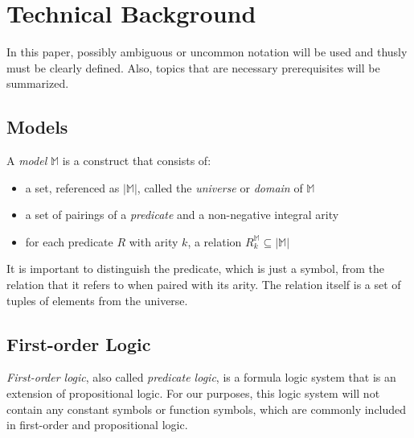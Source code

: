 \section{Technical Background}

	In this paper, possibly ambiguous or uncommon notation will be used and
	thusly must be clearly defined.  Also, topics that are necessary
	prerequisites will be summarized.

	\subsection{Models}

		A \emph{model} $\mathbb{M}$ is a construct that consists of:
		\begin{itemize}
		\item a set, referenced as $|\mathbb{M}|$, called the \emph{universe} or \emph{domain} of $\mathbb{M}$
		\item a set of pairings of a \emph{predicate} and a non-negative integral arity
		\item for each predicate $R$ with arity $k$, a relation $R^\mathbb{M}_k \subseteq |\mathbb{M}|$
		\end{itemize}
		It is important to distinguish the predicate, which is just a symbol,
		from the relation that it refers to when paired with its arity. The
		relation itself is a set of tuples of elements from the universe.

	\subsection{First-order Logic}

		\emph{First-order logic}, also called \emph{predicate logic}, is a
		formula logic system that is an extension of propositional logic. For
		our purposes, this logic system will not contain any constant symbols
		or function symbols, which are commonly included in first-order and
		propositional logic.


